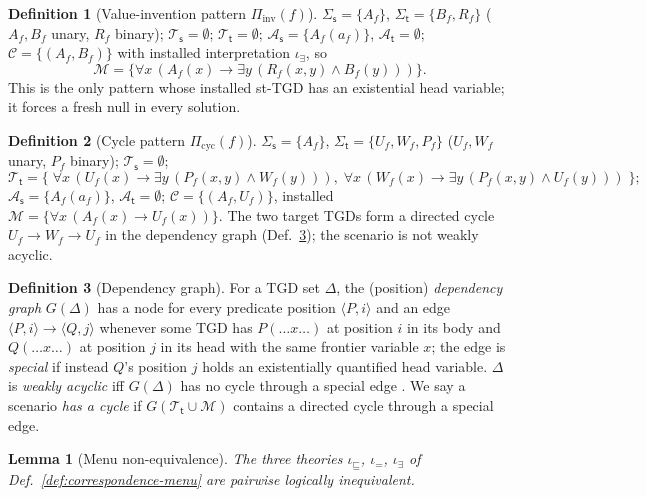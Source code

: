 \documentclass{amsart}
\newtheorem{lemma}{Lemma}
\theoremstyle{definition}
\newtheorem{definition}{Definition}
\newcommand{\Tbox}{\mathcal{T}}
\newcommand{\Abox}{\mathcal{A}}
\newcommand{\Sig}{\Sigma}
\newcommand{\Map}{\mathcal{M}}
\newcommand{\src}{\mathsf{s}}
\newcommand{\trg}{\mathsf{t}}
\newcommand{\Cor}{\mathcal{C}}
\begin{document}
\begin{definition}[Value-invention pattern $\Pi_{\mathrm{inv}}(f)$]\label{def:inv}
$\Sig_\src=\{A_f\}$, $\Sig_\trg=\{B_f,R_f\}$ ($A_f,B_f$ unary, $R_f$ binary);
$\Tbox_\src=\emptyset$; $\Tbox_\trg=\emptyset$;
$\Abox_\src=\{A_f(a_f)\}$, $\Abox_\trg=\emptyset$;
$\Cor=\{(A_f,B_f)\}$ with installed interpretation $\iota_\exists$, so
\[
\Map=\bigl\{\forall x\,(A_f(x)\to\exists y\,(R_f(x,y)\wedge B_f(y)))\bigr\}.
\]
This is the only pattern whose installed st-TGD has an existential head variable;
it forces a fresh null in every solution.
\end{definition}

\begin{definition}[Cycle pattern $\Pi_{\mathrm{cyc}}(f)$]\label{def:cyc}
$\Sig_\src=\{A_f\}$, $\Sig_\trg=\{U_f,W_f,P_f\}$ ($U_f,W_f$ unary, $P_f$
binary); $\Tbox_\src=\emptyset$;
\[
\Tbox_\trg=\bigl\{\;\forall x\,(U_f(x)\!\to\!\exists y\,(P_f(x,y)\wedge W_f(y))),\;
\forall x\,(W_f(x)\!\to\!\exists y\,(P_f(x,y)\wedge U_f(y)))\;\bigr\};
\]
$\Abox_\src=\{A_f(a_f)\}$, $\Abox_\trg=\emptyset$;
$\Cor=\{(A_f,U_f)\}$, installed
$\Map=\{\forall x\,(A_f(x)\to U_f(x))\}$.
The two target TGDs form a directed cycle $U_f\to W_f\to U_f$ in the dependency
graph (Def.~\ref{def:depgraph}); the scenario is not weakly acyclic.
\end{definition}

\begin{definition}[Dependency graph]\label{def:depgraph}
For a TGD set $\Delta$, the (position) \emph{dependency graph}
$G(\Delta)$ has a node for every predicate position $\langle P,i\rangle$ and an
edge $\langle P,i\rangle\to\langle Q,j\rangle$ whenever some TGD has $P(\dots
x\dots)$ at position $i$ in its body and $Q(\dots x\dots)$ at position $j$ in its
head with the same frontier variable $x$; the edge is \emph{special} if instead
$Q$'s position $j$ holds an existentially quantified head variable. $\Delta$ is
\emph{weakly acyclic} iff $G(\Delta)$ has no cycle through a special edge
\cite{FaginKMP05}. We say a scenario \emph{has a cycle} if
$G(\Tbox_\trg\cup\Map)$ contains a directed cycle through a special edge.
\end{definition}

\begin{lemma}[Menu non-equivalence]\label{lem:menu-distinct}
The three theories $\iota_{\sqsubseteq}$, $\iota_{=}$, $\iota_{\exists}$ of
Def.~\ref{def:correspondence-menu} are pairwise logically inequivalent.
\end{lemma}
\end{document}
